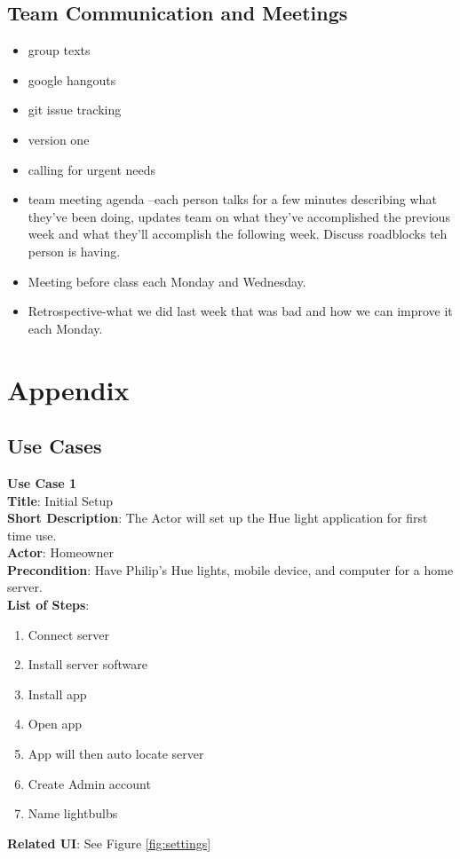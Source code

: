 \documentclass[12pt]{article}
\begin{document}
\subsection{Team Communication and Meetings}
\begin{itemize}
\item group texts
\item google hangouts
\item git issue tracking
\item version one
\item calling for urgent needs
\item team meeting agenda --each person talks for a few minutes describing what they've been doing, updates team on what they've accomplished the previous week and what they'll accomplish the following week. Discuss roadblocks teh person is having.
\item Meeting before class each Monday and Wednesday.
\item Retrospective-what we did last week that was bad and how we can improve it each Monday.
\end{itemize}
\clearpage



\section{Appendix}
\setcounter{figure}{0}
  \subsection{Use Cases}
  \begin{samepage}
  \begin{framed}
    \textbf{Use Case 1}\\
    \textbf{Title}: Initial Setup\\
    \textbf{Short Description}:  The Actor will set up the Hue light application for first time use.  \\
    \textbf{Actor}: Homeowner \\
    \textbf{Precondition}: Have Philip's Hue lights, mobile device, and computer for a home server. \\
    \textbf{List of Steps}:
    \begin{enumerate}
      \item Connect server
      \item Install server software
      \item Install app
      \item Open app
      \item App will then auto locate server
      \item Create Admin account
      \item Name lightbulbs
    \end{enumerate}
    \textbf{Related UI}: See Figure \ref{fig:settings} 
  \end{framed}
\end{samepage}
\end{document}
